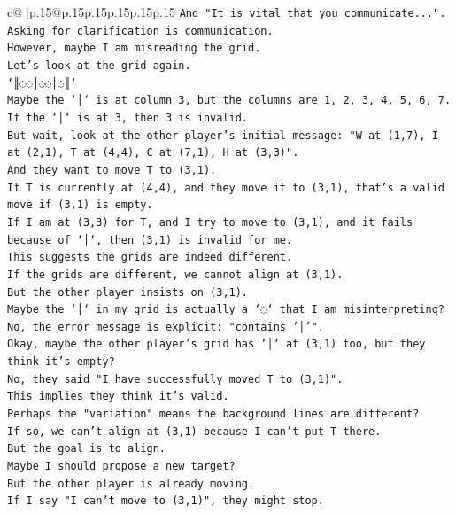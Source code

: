 \documentclass{article}
\begin{document}
{\begin{supertabular}{c@{$\;$}|p{.15\linewidth}@{}p{.15\linewidth}p{.15\linewidth}p{.15\linewidth}p{.15\linewidth}p{.15\linewidth}}
{{{\texttt{And "It is vital that you communicate...".} \\
\texttt{Asking for clarification is communication.} \\
\texttt{However, maybe I am misreading the grid.} \\
\texttt{Let's look at the grid again.} \\
\texttt{`║◌◌│◌◌│◌║`} \\
\texttt{Maybe the `│` is at column 3, but the columns are 1, 2, 3, 4, 5, 6, 7.} \\
\texttt{If the `│` is at 3, then 3 is invalid.} \\
\texttt{But wait, look at the other player's initial message: "W at (1,7), I at (2,1), T at (4,4), C at (7,1), H at (3,3)".} \\
\texttt{And they want to move T to (3,1).} \\
\texttt{If T is currently at (4,4), and they move it to (3,1), that's a valid move if (3,1) is empty.} \\
\texttt{If I am at (3,3) for T, and I try to move to (3,1), and it fails because of `│`, then (3,1) is invalid for me.} \\
\texttt{This suggests the grids are indeed different.} \\
\texttt{If the grids are different, we cannot align at (3,1).} \\
\texttt{But the other player insists on (3,1).} \\
\texttt{Maybe the `│` in my grid is actually a `◌` that I am misinterpreting?} \\
\texttt{No, the error message is explicit: "contains '│'".} \\
\texttt{Okay, maybe the other player's grid has `│` at (3,1) too, but they think it's empty?} \\
\texttt{No, they said "I have successfully moved T to (3,1)".} \\
\texttt{This implies they think it's valid.} \\
\texttt{Perhaps the "variation" means the background lines are different?} \\
\texttt{If so, we can't align at (3,1) because I can't put T there.} \\
\texttt{But the goal is to align.} \\
\texttt{Maybe I should propose a new target?} \\
\texttt{But the other player is already moving.} \\
\texttt{If I say "I can't move to (3,1)", they might stop.} \\
}}}
\end{supertabular}}
\end{document}

